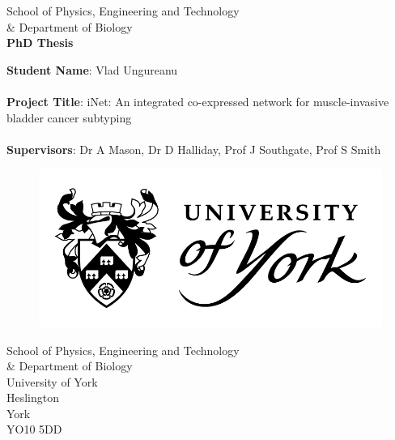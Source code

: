 \begin{titlepage} 
  \begin{center} 
    
    	\large School of Physics, Engineering and Technology \\ \& Department of Biology \\
        \vspace{1.2cm}
		\Huge \textbf{PhD Thesis} \\
        \vspace{1.2cm}
            
       \begin{flushleft}
        \large \textbf{Student Name}: Vlad Ungureanu \\~\\
        \large \textbf{Project Title}: iNet: An integrated co-expressed network for muscle-invasive bladder cancer subtyping \\~\\
        \large \textbf{Supervisors}: Dr A Mason, Dr D Halliday, Prof J Southgate, Prof S Smith
 
       \end{flushleft} 
            
           \begin{figure}[t]
          	\includegraphics[scale=0.5]{Images/Resources/UOY_logo}
          \end{figure}
    \vspace{1.2cm}
    \small School of Physics, Engineering and Technology \\ \& Department of Biology \\
    \small University of York \\
    \small Heslington \\
    \small York \\
    \small YO10 5DD\\
                  
 \end{center} 

\end{titlepage}